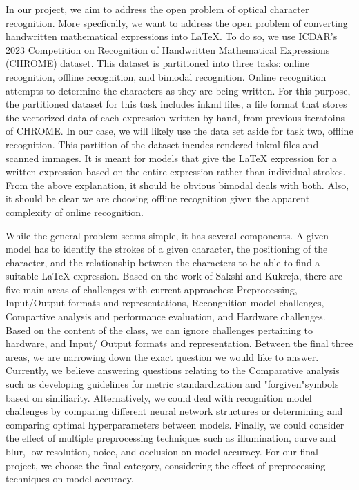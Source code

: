 \documentclass[../proposal.tex]{subfiles}
\begin{document}
\indent In our project, we aim to address the open problem of optical character recognition. More specfically, we want to address the open problem of converting handwritten mathematical expressions into LaTeX. To do so, we use ICDAR's 2023 Competition on Recognition of Handwritten Mathematical Expressions (CHROME) dataset. This dataset is partitioned into three tasks: online recognition, offline recognition, and bimodal recognition. Online recognition attempts to determine the characters as they are being written. For this purpose, the partitioned dataset for this task includes inkml files, a file format that stores the vectorized data of each expression written by hand, from previous iteratoins of CHROME\@. In our case, we will likely use the data set aside for task two, offline recognition. This partition of the dataset incudes rendered inkml files and scanned immages. It is meant for models that give the LaTeX expression for a written expression based on the entire expression rather than individual strokes. From the above explanation, it should be obvious bimodal deals with both. Also, it should be clear we are choosing offline recognition given the apparent complexity of online recognition. 

\indent While the general problem seems simple, it has several components. A given model has to identify the strokes of a given character, the positioning of the character, and the relationship between the characters to be able to find a suitable LaTeX expression. Based on the work of Sakshi and Kukreja, there are five main areas of challenges with current approaches: Preprocessing, Input/Output formats and representations, Recongnition model challenges, Compartive analysis and performance evaluation, and Hardware challenges. Based on the content of the class, we can ignore challenges pertaining to hardware, and Input/ Output formats and representation. Between the final three areas, we are narrowing down the exact question we would like to answer. Currently, we believe answering questions relating to the Comparative analysis such as developing guidelines for metric standardization and "forgiven"symbols based on similiarity. Alternatively, we could deal with recognition model challenges by comparing different neural network structures or determining and comparing optimal hyperparameters between models. Finally, we could consider the effect of multiple preprocessing techniques such as illumination, curve and blur, low resolution, noice, and occlusion on model accuracy. For our final project, we choose the final category, considering the effect of preprocessing techniques on model accuracy. 
\end{document}

